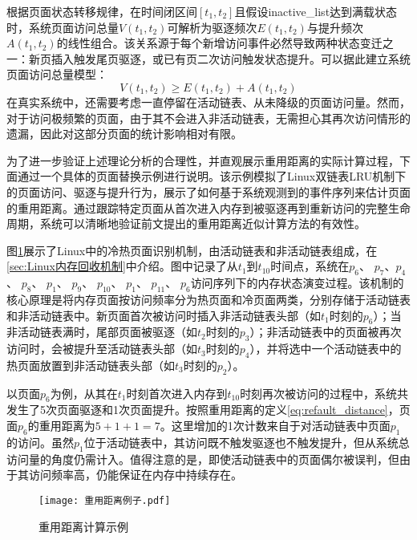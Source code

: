 根据页面状态转移规律，在时间闭区间$[t_1, t_2]$且假设inactive\_list达到满载状态时，系统页面访问总量$V(t_1, t_2)$可解析为驱逐频次$E(t_1, t_2)$与提升频次$A(t_1, t_2)$的线性组合。该关系源于每个新增访问事件必然导致两种状态变迁之一：新页插入触发尾页驱逐，或已有页二次访问触发状态提升。可以据此建立系统页面访问总量模型：
\begin{equation}
  V(t_1, t_2) \geq E(t_1,t_2) + A(t_1,t_2)
\end{equation}
在真实系统中，还需要考虑一直停留在活动链表、从未降级的页面访问量。然而，对于访问极频繁的页面，由于其不会进入非活动链表，无需担心其再次访问情形的遗漏，因此对这部分页面的统计影响相对有限。

为了进一步验证上述理论分析的合理性，并直观展示重用距离的实际计算过程，下面通过一个具体的页面替换示例进行说明。该示例模拟了Linux双链表LRU机制下的页面访问、驱逐与提升行为，展示了如何基于系统观测到的事件序列来估计页面的重用距离。通过跟踪特定页面从首次进入内存到被驱逐再到重新访问的完整生命周期，系统可以清晰地验证前文提出的重用距离近似计算方法的有效性。

图\ref{fig:page_replacement_example}展示了Linux中的冷热页面识别机制，由活动链表和非活动链表组成，在\ref{sec:Linux内存回收机制}中介绍。图中记录了从$t_1$到$t_{10}$时间点，系统在\(p_6\)、 \(p_7\)、\(p_4\)、 \(p_8\)、 \(p_1\)、 \(p_9\)、 \(p_{10}\)、 \(p_1\)、 \(p_{11}\)、 \(p_6\)访问序列下的内存状态演变过程。该机制的核心原理是将内存页面按访问频率分为热页面和冷页面两类，分别存储于活动链表和非活动链表中。新页面首次被访问时插入非活动链表头部（如$t_1$时刻的\(p_6\)）；当非活动链表满时，尾部页面被驱逐（如\(t_2\)时刻的$p_3$）；非活动链表中的页面被再次访问时，会被提升至活动链表头部（如$t_3$时刻的$p_4$），并将选中一个活动链表中的热页面放置到非活动链表头部（如$t_3$时刻的$p_2$）。

以页面$p_6$为例，从其在$t_1$时刻首次进入内存到$t_{10}$时刻再次被访问的过程中，系统共发生了5次页面驱逐和1次页面提升。按照重用距离的定义\ref{eq:refault_distance}，页面$p_6$的重用距离为$5+1+1=7$。这里增加的1次计数来自于对活动链表中页面$p_1$的访问。虽然$p_1$位于活动链表中，其访问既不触发驱逐也不触发提升，但从系统总访问量的角度仍需计入。值得注意的是，即使活动链表中的页面偶尔被误判，但由于其访问频率高，仍能保证在内存中持续存在。
\begin{figure}[H]
  \centering
  \texttt{[image: 重用距离例子.pdf]}
  \caption{重用距离计算示例}
  \label{fig:page_replacement_example}
\end{figure}





